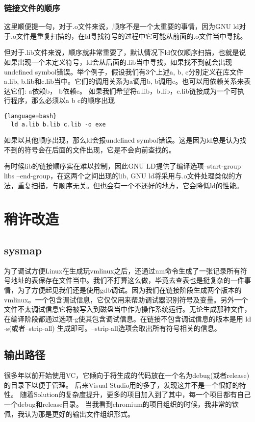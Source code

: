\subsubsection{链接文件的顺序}
这里顺便提一句，对于.o文件来说，顺序不是一个太重要的事情，因为GNU ld对于.o文件是重复扫描的，在ld寻找符号的过程中它可能从前面的.o文件当中寻找。

但对于.lib文件来说，顺序就非常重要了，默认情况下ld仅仅顺序扫描，也就是说如果出现一个未定义符号，ld会从后面的.lib当中寻找，如果找不到就会出现undefined symbol错误。举个例子，假设我们有3个上述a, b, c分别定义在库文件a.lib, b.lib和c.lib当中。它们的调用关系为a调用b, b调用c。也可以用依赖关系来表达它们: a依赖b， b依赖c。
如果我们希望将a.lib，b.lib，c.lib链接成为一个可执行程序，那么必须以a b c的顺序出现
\begin{lstlisting}{language=bash}
  ld a.lib b.lib c.lib -o exe
\end{lstlisting}
如果以其他顺序出现，那么ld会报undefined symbol错误。这是因为ld总是认为找不到的符号会在后面的文件出现，它是不会向前查找的。

有时候lib的链接顺序实在难以控制，因此GNU LD提供了编译选项--start-group libs --end-group，在这两个之间出现的lib, GNU ld将采用与.o文件处理类似的方法，重复扫描，与顺序无关。但也会有一个不还好的地方，它会降低ld的性能。


\section{稍许改造}
\subsection{sysmap}
为了调试方便Linux在生成玩vmlinux之后，还通过nm命令生成了一张记录所有符号地址的表保存在文件当中。我们不打算这么做，毕竟去查表也是挺复杂的一件事情，为了方便起见我们还是使用gdb调试。因为我们在链接阶段生成两个版本的vmlinux。一个包含调试信息，它仅仅用来帮助调试器识别符号及变量。另外一个文件不太调试信息它将被写入到磁盘当中作为操作系统运行。无论生成那种文件，在编译阶段都通过选项-g使其包含调试信息。在链接不包含调试信息的版本是用 ld -s(或者--strip-all) 生成即可。--strip-all选项会取出所有符号相关的信息。
\subsection{输出路径}
很多年以前开始使用VC，它倾向于将生成的代码放在一个名为debug(或者release)的目录下以便于管理。
后来Visual Studio用的多了，发现这并不是一个很好的特性。
随着Solution的复杂度提升，更多的项目加入到了其中，每一个项目都有自己一个debug和release目录。
当我看到chromium的项目组织的时候，我非常的钦佩，我认为那是更好的输出文件组织形式。
